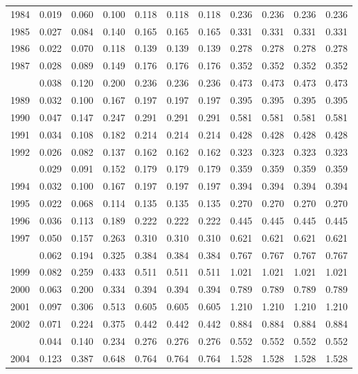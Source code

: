 \documentclass[
]{article}
\begin{document}
\begin{longtable}[t]{lrrrrrrrrrr}
1984 & 0.019 & 0.060 & 0.100 & 0.118 & 0.118 & 0.118 & 0.236 & 0.236 & 0.236 & 0.236\\
1985 & 0.027 & 0.084 & 0.140 & 0.165 & 0.165 & 0.165 & 0.331 & 0.331 & 0.331 & 0.331\\
1986 & 0.022 & 0.070 & 0.118 & 0.139 & 0.139 & 0.139 & 0.278 & 0.278 & 0.278 & 0.278\\
1987 & 0.028 & 0.089 & 0.149 & 0.176 & 0.176 & 0.176 & 0.352 & 0.352 & 0.352 & 0.352\\
\addlinespace
1988 & 0.038 & 0.120 & 0.200 & 0.236 & 0.236 & 0.236 & 0.473 & 0.473 & 0.473 & 0.473\\
1989 & 0.032 & 0.100 & 0.167 & 0.197 & 0.197 & 0.197 & 0.395 & 0.395 & 0.395 & 0.395\\
1990 & 0.047 & 0.147 & 0.247 & 0.291 & 0.291 & 0.291 & 0.581 & 0.581 & 0.581 & 0.581\\
1991 & 0.034 & 0.108 & 0.182 & 0.214 & 0.214 & 0.214 & 0.428 & 0.428 & 0.428 & 0.428\\
1992 & 0.026 & 0.082 & 0.137 & 0.162 & 0.162 & 0.162 & 0.323 & 0.323 & 0.323 & 0.323\\
\addlinespace
1993 & 0.029 & 0.091 & 0.152 & 0.179 & 0.179 & 0.179 & 0.359 & 0.359 & 0.359 & 0.359\\
1994 & 0.032 & 0.100 & 0.167 & 0.197 & 0.197 & 0.197 & 0.394 & 0.394 & 0.394 & 0.394\\
1995 & 0.022 & 0.068 & 0.114 & 0.135 & 0.135 & 0.135 & 0.270 & 0.270 & 0.270 & 0.270\\
1996 & 0.036 & 0.113 & 0.189 & 0.222 & 0.222 & 0.222 & 0.445 & 0.445 & 0.445 & 0.445\\
1997 & 0.050 & 0.157 & 0.263 & 0.310 & 0.310 & 0.310 & 0.621 & 0.621 & 0.621 & 0.621\\
\addlinespace
1998 & 0.062 & 0.194 & 0.325 & 0.384 & 0.384 & 0.384 & 0.767 & 0.767 & 0.767 & 0.767\\
1999 & 0.082 & 0.259 & 0.433 & 0.511 & 0.511 & 0.511 & 1.021 & 1.021 & 1.021 & 1.021\\
2000 & 0.063 & 0.200 & 0.334 & 0.394 & 0.394 & 0.394 & 0.789 & 0.789 & 0.789 & 0.789\\
2001 & 0.097 & 0.306 & 0.513 & 0.605 & 0.605 & 0.605 & 1.210 & 1.210 & 1.210 & 1.210\\
2002 & 0.071 & 0.224 & 0.375 & 0.442 & 0.442 & 0.442 & 0.884 & 0.884 & 0.884 & 0.884\\
\addlinespace
2003 & 0.044 & 0.140 & 0.234 & 0.276 & 0.276 & 0.276 & 0.552 & 0.552 & 0.552 & 0.552\\
2004 & 0.123 & 0.387 & 0.648 & 0.764 & 0.764 & 0.764 & 1.528 & 1.528 & 1.528 & 1.528\\

\end{longtable}
\end{document}
